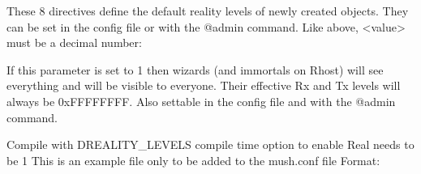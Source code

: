 \documentclass[letterpaper,10pt,english]{sphinxmanual}
\begin{document}
\sphinxAtStartPar
These 8 directives define the default reality levels of newly created
objects. They can be set in the config file or with the @admin command.
Like above, \textless{}value\textgreater{} must be a decimal number:

\begin{sphinxVerbatim}[commandchars=\\\{\}]
 
\end{sphinxVerbatim}

\sphinxAtStartPar
If this parameter is set to 1 then wizards (and immortals on Rhost) will see
everything and will be visible to everyone. Their effective Rx and Tx levels
will always be 0xFFFFFFFF. Also settable in the config file and with the
@admin command.

\sphinxAtStartPar
Compile with \sphinxhyphen{}DREALITY\_LEVELS compile time option to enable \textquotesingle{}Real\textquotesingle{} needs to be \textquotesingle{}1\textquotesingle{}
This is an example file only to be added to the mush.conf file Format:

\begin{sphinxVerbatim}[commandchars=\\\{\}]
       
\end{sphinxVerbatim}
\end{document}
